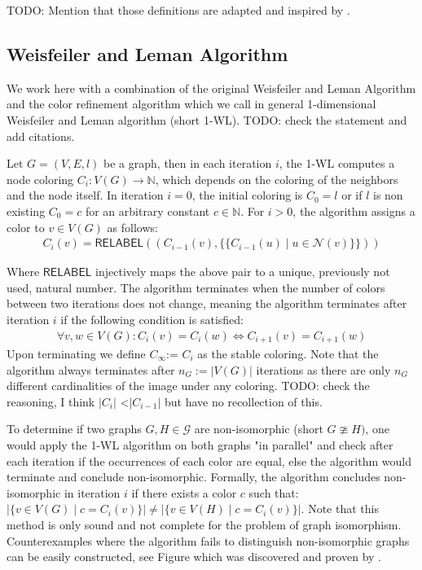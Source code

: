 \documentclass[11pt, dvipsnames, DIV=12]{scrreprt}
\theoremstyle{definition}
\newcommand{\MSopen}{\{\!\!\{}
\newcommand{\MSclose}{\}\!\!\}}
\begin{document}
TODO: Mention that those definitions are adapted and inspired by \cite{Morris2021}.

\subsection{Weisfeiler and Leman Algorithm}\label{sec:1-WL Definition}
We work here with a combination of the original Weisfeiler and Leman Algorithm and the color refinement algorithm which we call in general 1-dimensional Weisfeiler and Leman algorithm (short 1-WL). TODO: check the statement and add citations.

Let $G = (V,E,l)$ be a graph, then in each iteration $i$, the 1-WL computes a node coloring $C_i: V(G) \rightarrow \mathbb{N}$, which depends on the coloring of the neighbors and the node itself. In iteration $i=0$, the initial coloring is $C_0 = l$ or if $l$ is non existing $C_0 = c$ for an arbitrary constant $c \in \mathbb{N}$. For $i > 0$, the algorithm assigns a color to $v \in V(G)$ as follows:
\begin{align*}
C_i (v) = \textsf{RELABEL}((C_{i-1}(v), \MSopen C_{i-1}(u) \mid u \in \mathcal{N}(v) \MSclose))
\end{align*}

\noindent Where $\textsf{RELABEL}$ injectively maps the above pair to a unique, previously not used, natural number. The algorithm terminates when the number of colors between two iterations does not change, meaning the algorithm terminates after iteration $i$ if the following condition is satisfied:
\begin{align}
\forall v,w \in V(G):  C_i(v) = C_i(w) \iff C_{i+1}(v) = C_{i+1}(w)
\end{align}
Upon terminating we define $C_{\infty}$:= $C_i$ as the stable coloring. Note that the algorithm always terminates after $n_G := |V(G)|$ iterations as there are only $n_G$ different cardinalities of the image under any coloring. TODO: check the reasoning, I think $|C_i|$ <$|C_{i-1}|$ but have no recollection of this.

To determine if two graphs $G, H \in \mathcal{G}$ are non-isomorphic (short $G \ncong H)$, one would apply the 1-WL algorithm on both graphs "in parallel" and check after each iteration if the occurrences of each color are equal, else the algorithm would terminate and conclude non-isomorphic. Formally, the algorithm concludes non-isomorphic in iteration $i$ if there exists a color $c$ such that: $|\{ v \in V(G) \mid c = C_i(v)\} | \neq |\{ v \in V(H) \mid c = C_i(v)\} |$. Note that this method is only sound and not complete for the problem of graph isomorphism. Counterexamples where the algorithm fails to distinguish non-isomorphic graphs can be easily constructed, see Figure  which was discovered and proven by \cite{Cai1992}.
\end{document}
